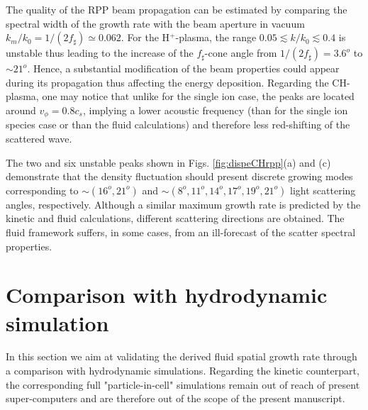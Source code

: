 \documentclass[
 reprint,
 superscriptaddress,
 amsmath,amssymb,
 aps,
]{revtex4-1}
\begin{document}
The quality of the RPP beam propagation can be estimated by comparing the spectral width of the growth rate  with the  beam aperture in vacuum $k_m/k_0=1/(2f_\sharp) \simeq 0.062$.
For the H$^+$-plasma, 
the range  $0.05 \lesssim k/k_0\lesssim 0.4$ 
is unstable thus  
leading to the increase of the $f_\sharp$-cone 
angle from $1/(2f_\sharp)=3.6^o$ to $\sim 21^o$.
Hence, a substantial modification of the beam 
properties  could appear during its propagation thus affecting the energy deposition.
Regarding the CH-plasma, one may notice that unlike for the single ion case, the peaks are located around $v_\phi=0.8c_s$, implying a lower acoustic frequency (than for the single ion species case or than the fluid calculations) and therefore less red-shifting of the scattered wave.

The two and six unstable peaks shown  in  Figs. \ref{fig:dispeCHrpp}(a) and (c) demonstrate that the density fluctuation should present discrete  growing modes corresponding to $\sim (16^o,21^o)$ and $ \sim (8^o,11^o,14^o,17^o,19^o,21^o)$ light scattering angles, respectively.
Although a similar maximum growth rate is predicted by the kinetic and fluid calculations, different scattering directions are obtained. The fluid framework  suffers, in some cases, from an ill-forecast of the scatter spectral properties. 

\section{Comparison with hydrodynamic simulation}
In this section we aim at validating the derived fluid spatial growth rate through a  comparison with hydrodynamic simulations. Regarding the kinetic counterpart, the corresponding full "particle-in-cell" simulations remain out of reach of present super-computers and are therefore out of the scope of the present manuscript. 
\end{document}
